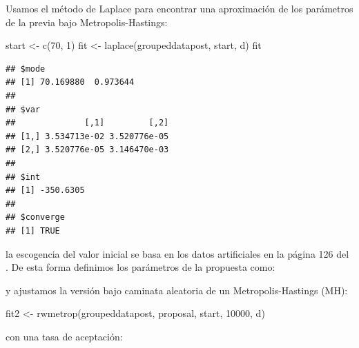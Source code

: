 \documentclass[
  12pt,
]{book}
\newenvironment{Shaded}{\begin{snugshade}}{\end{snugshade}}
\newcommand{\AttributeTok}[1]{\textcolor[rgb]{0.77,0.63,0.00}{#1}}
\newcommand{\DecValTok}[1]{\textcolor[rgb]{0.00,0.00,0.81}{#1}}
\newcommand{\FunctionTok}[1]{\textcolor[rgb]{0.00,0.00,0.00}{#1}}
\newcommand{\NormalTok}[1]{#1}
\newcommand{\OtherTok}[1]{\textcolor[rgb]{0.56,0.35,0.01}{#1}}
\newcommand{\SpecialCharTok}[1]{\textcolor[rgb]{0.00,0.00,0.00}{#1}}
\theoremstyle{definition}
\theoremstyle{definition}
\theoremstyle{definition}
\theoremstyle{definition}
\theoremstyle{remark}
\begin{document}
Usamos el método de Laplace para encontrar una aproximación de los parámetros de la previa bajo Metropolis-Hastings:

\begin{Shaded}
\begin{Highlighting}[]
\NormalTok{start }\OtherTok{\textless{}{-}} \FunctionTok{c}\NormalTok{(}\DecValTok{70}\NormalTok{, }\DecValTok{1}\NormalTok{)}
\NormalTok{fit }\OtherTok{\textless{}{-}} \FunctionTok{laplace}\NormalTok{(groupeddatapost, start, d)}
\NormalTok{fit}
\end{Highlighting}
\end{Shaded}

\begin{verbatim}
## $mode
## [1] 70.169880  0.973644
## 
## $var
##              [,1]         [,2]
## [1,] 3.534713e-02 3.520776e-05
## [2,] 3.520776e-05 3.146470e-03
## 
## $int
## [1] -350.6305
## 
## $converge
## [1] TRUE
\end{verbatim}

la escogencia del valor inicial se basa en los datos artificiales en la página 126 del \autocite{Albert2009}. De esta forma definimos los parámetros de la propuesta como:

\begin{Shaded}
\end{Shaded}

y ajustamos la versión bajo caminata aleatoria de un Metropolis-Hastings (MH):

\begin{Shaded}
\begin{Highlighting}[]
\NormalTok{fit2 }\OtherTok{\textless{}{-}} \FunctionTok{rwmetrop}\NormalTok{(groupeddatapost, proposal, start,}
    \DecValTok{10000}\NormalTok{, d)}
\end{Highlighting}
\end{Shaded}

con una tasa de aceptación:

\begin{Shaded}
\end{Shaded}
\end{document}
